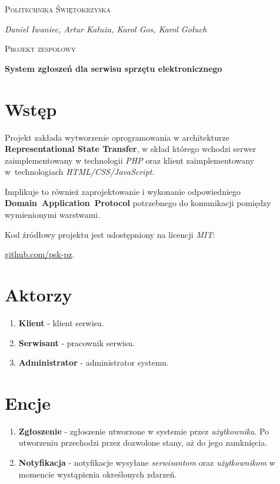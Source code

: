 \documentclass[11pt,a4paper]{article}
\begin{document}
\begin{titlepage}
    \centering
    {\scshape\huge Politechnika Świętokrzyska \par}
    \vspace{0.5cm}
    {\Large\itshape Daniel Iwaniec, Artur Kałuża, Karol Gos, Karol Gołuch\par}
    \vspace{2cm}
    {\scshape\LARGE Projekt zespołowy\par}
    \vspace{0.5cm}
    {\bfseries System zgłoszeń dla serwisu sprzętu elektronicznego\par}

    \vfil

    \raggedright
    \section{Wstęp}
    Projekt zakłada wytworzenie oprogramowania w architekturze \textbf{Representational State Transfer}, w skład którego wchodzi serwer zaimplementowany w technologii \textit{PHP} oraz klient zaimplementowany w~technologiach \textit{HTML/CSS/JavaScript}.
    \par \bigskip Implikuje to również zaprojektowanie i wykonanie odpowiedniego \textbf{Domain~Application~Protocol} potrzebnego do komunikacji pomiędzy wymienionymi warstwami.
    \par \bigskip Kod źródłowy projektu jest udostępniony na licencji \textit{MIT}:
    \par \underline{\href{https://github.com/psk-pz}{github.com/psk-pz}}.
\end{titlepage}

\section{Aktorzy}
\begin{enumerate}
\item{\textbf{Klient} - klient serwisu.}
\item{\textbf{Serwisant} - pracownik serwisu.}
\item{\textbf{Administrator} - administrator systemu.}
\end{enumerate}

\section{Encje}
\begin{enumerate}
\item{\textbf{Zgłoszenie} - zgłoszenie utworzone w systemie przez \textit{użytkownika}. Po utworzeniu przechodzi przez dozwolone stany, aż do jego zamknięcia.}
\item{\textbf{Notyfikacja} - notyfikacje wysyłane \textit{serwisantom} oraz \textit{użytkownikom} w momencie wystąpienia określonych zdarzeń.}
\end{enumerate}
\end{document}
